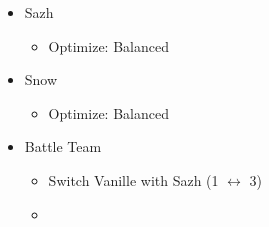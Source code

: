 \begin{multicols}{2}
\begin{menu}
\begin{itemize}
\begin{itemize}
\begin{itemize}
				      \end{itemize}
				\item Sazh
				      \begin{itemize}
					      \item Optimize: Balanced
				      \end{itemize}
				\item Snow
				      \begin{itemize}
					      \item Optimize: Balanced
				      \end{itemize}
			\end{itemize}
			\paradigm
			\begin{itemize}
				\item Battle Team
				      \begin{itemize}
					      \item Switch Vanille with Sazh (1 $\leftrightarrow$ 3)
					      \item {}%
					            {\paradigmline{\com}{\com}{\med}}%
					            {\paradigmline[2]{\textit{\com}}{\textit{\com}}{\textit{(\rav)}}}%
					            {\paradigmline{(\sen)}{\sen}{(\med)}}%
					            {\paradigmline{\syn}{\rav}{\rav}}%
					            {\paradigmline{\rav}{\rav}{\sab}}%
					            {\paradigmline{\rav}{\rav}{\rav}}
				      \end{itemize}
			\end{itemize}
		\end{itemize}


\end{menu}
\end{multicols}
